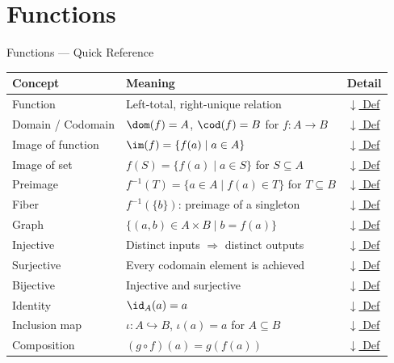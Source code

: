 \section{Functions}


\begin{toolkitbox}{Functions --- Quick Reference}
\small
\begin{tabular}{l l l}
\toprule
\textbf{Concept} & \textbf{Meaning} & \textbf{Detail} \\
\midrule
Function         & Left-total, right-unique relation                            & \hyperref[def:function]{$\downarrow$ Def} \\
Domain / Codomain & $\dom(f) = A$,\; $\cod(f) = B$ for $f : A \to B$            & \hyperref[def:domain-codomain]{$\downarrow$ Def} \\
Image of function & $\im(f) = \{f(a) \mid a \in A\}$                            & \hyperref[def:image-function]{$\downarrow$ Def} \\
Image of set      & $f(S) = \{f(a) \mid a \in S\}$ for $S \subseteq A$          & \hyperref[def:image-set]{$\downarrow$ Def} \\
Preimage          & $f^{-1}(T) = \{a \in A \mid f(a) \in T\}$ for $T \subseteq B$ & \hyperref[def:preimage]{$\downarrow$ Def} \\
Fiber             & $f^{-1}(\{b\})$: preimage of a singleton                    & \hyperref[def:fiber]{$\downarrow$ Def} \\
Graph             & $\{(a,b) \in A\times B \mid b = f(a)\}$                     & \hyperref[def:graph]{$\downarrow$ Def} \\
Injective         & Distinct inputs $\Rightarrow$ distinct outputs               & \hyperref[def:injective]{$\downarrow$ Def} \\
Surjective        & Every codomain element is achieved                          & \hyperref[def:surjective]{$\downarrow$ Def} \\
Bijective         & Injective and surjective                                    & \hyperref[def:bijective]{$\downarrow$ Def} \\
Identity          & $\id_A(a) = a$                                              & \hyperref[def:identity]{$\downarrow$ Def} \\
Inclusion map     & $\iota : A \hookrightarrow B$, $\iota(a) = a$ for $A \subseteq B$ & \hyperref[def:inclusion]{$\downarrow$ Def} \\
Composition       & $(g \circ f)(a) = g(f(a))$                                  & \hyperref[def:composition]{$\downarrow$ Def} \\

\end{tabular}
\end{toolkitbox}
